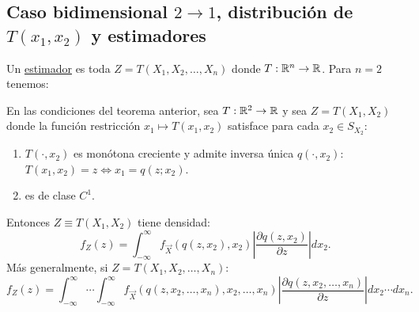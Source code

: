 \subsection{Caso bidimensional $2 \to 1$, distribución de $T(x_1, x_2)$ y estimadores}

Un \underline{estimador} es toda $Z = T(X_1, X_2, \dots, X_n)$ donde $T : \mathbb{R}^n \to \mathbb{R}$. Para $n = 2$ tenemos:

\begin{proposicion}[28]
En las condiciones del teorema anterior, sea $T : \mathbb{R}^2 \to \mathbb{R}$ y sea $Z = T(X_1, X_2)$ donde la función restricción $x_1 \mapsto T(x_1, x_2)$ satisface para cada $x_2 \in S_{X_2}$:
\begin{enumerate}
  \item $T(\cdot, x_2)$ es monótona creciente y admite inversa única $q(\cdot, x_2)$: $T(x_1, x_2) = z \iff x_1 = q(z; x_2)$.
  \item es de clase $C^1$.
\end{enumerate}
Entonces $Z \equiv T(X_1, X_2)$ tiene densidad:
\[
  f_Z(z) = \int_{-\infty}^\infty f_{\vec{X}}(q(z, x_2), x_2) \left|\frac{\partial q(z, x_2)}{\partial z}\right| dx_2.
\]
Más generalmente, si $Z = T(X_1, X_2, \dots, X_n)$:
\[
  f_Z(z) = \int_{-\infty}^\infty \cdots \int_{-\infty}^\infty f_{\vec{X}}(q(z, x_2, \dots, x_n), x_2, \dots, x_n) \left|\frac{\partial q(z, x_2, \dots, x_n)}{\partial z}\right| dx_2 \cdots dx_n.
\]
\end{proposicion}

